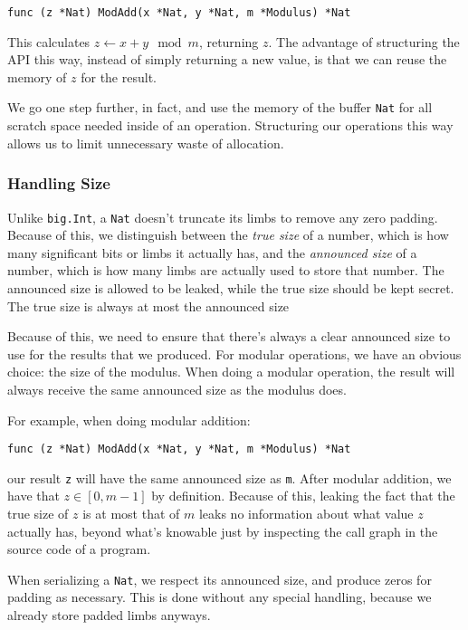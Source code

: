 \documentclass[11pt, a4paper]{article} %
\begin{document}
{\begin{verbatim}
func (z *Nat) ModAdd(x *Nat, y *Nat, m *Modulus) *Nat
\end{verbatim}

This calculates $z \leftarrow x + y \mod m$, returning $z$. The advantage
of structuring the API this way, instead of simply returning a new
value, is that we can reuse the memory of $z$ for the result.

We go one step further, in fact, and use the memory of the buffer
\texttt{Nat} for all scratch space needed inside of an operation.
Structuring our operations this way allows us to limit unnecessary waste
of allocation.

\subsubsection{Handling Size}

Unlike \texttt{big.Int}, a \texttt{Nat} doesn't truncate its limbs
to remove any zero padding. Because of this, we distinguish
between the \emph{true size} of a number, which is how many significant
bits or limbs it actually has, and the \emph{announced size}
of a number, which is how many limbs are actually used to store
that number. The announced size is allowed to be leaked, while the
true size should be kept secret. The true size is always
at most the announced size

Because of this, we need to ensure that there's always a clear
announced size to use for the results that we produced. For modular
operations, we have an obvious choice: the size of the modulus.
When doing a modular operation, the result will always receive
the same announced size as the modulus does.

For example, when doing modular addition:

\begin{verbatim}
func (z *Nat) ModAdd(x *Nat, y *Nat, m *Modulus) *Nat
\end{verbatim}

our result \texttt{z} will have the same announced size as \texttt{m}.
After modular addition, we have that $z \in [0, m - 1]$ by definition.
Because of this, leaking the fact that the true size of $z$
is at most that of $m$ leaks no information about what value $z$
actually has, beyond what's knowable just by inspecting the call
graph in the source code of a program.

When serializing a \texttt{Nat}, we respect its announced size,
and produce zeros for padding as necessary. This is done without
any special handling, because we already store padded limbs anyways.

}
\end{document}
